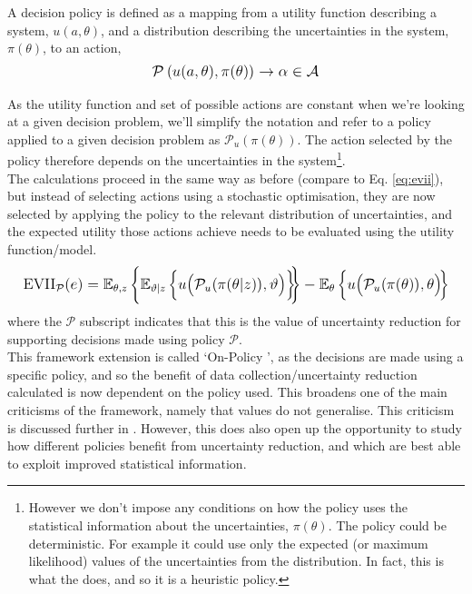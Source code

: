 A decision policy is defined as a mapping from a utility function describing a system, $u(a,\theta)$, and a distribution describing the uncertainties in the system, $\pi(\theta)$, to an action,
\begin{equation} \label{eq:policy-defn}
    \mathlarger{\mathcal{P} \left( u(a,\theta),\pi(\theta) \right) \rightarrow \alpha \in \mathcal{A}}
\end{equation}

As the utility function and set of possible actions are constant when we're looking at a given decision problem, we'll simplify the notation and refer to a policy applied to a given decision problem as $\mathcal{P}_u(\pi(\theta))$. The action selected by the policy therefore depends on the uncertainties in the system\footnote{However we don't impose any conditions on how the policy uses the statistical information about the uncertainties, $\pi(\theta)$. The policy could be deterministic. For example it could use only the expected (or maximum likelihood) values of the uncertainties from the distribution. In fact, this is what the  does, and so it is a heuristic policy.}.\\

The  calculations proceed in the same way as before (compare to Eq. \ref{eq:evii}), but instead of selecting actions using a stochastic optimisation, they are now selected by applying the policy to the relevant distribution of uncertainties, and the expected utility those actions achieve needs to be evaluated using the utility function/model.
\begin{equation} \label{eq:OP-voi}
    \mathlarger{
        \text{EVII}_{\mathcal{P}}(e) =
        \mathbb{E}_{\theta,z} \left\lbrace \mathbb{E}_{\vartheta|z} \left\lbrace u\!\left( \mathcal{P}_u\!\left(\pi (\theta|z)\right)\!,\vartheta \right) \right\rbrace\!\!\right\rbrace
        - \mathbb{E}_{\theta} \left\lbrace u\!\left(\mathcal{P}_u\!\left(\pi (\theta)\right)\!,\theta \right)\!\right\rbrace
    }
\end{equation}
where the $\mathcal{P}$ subscript indicates that this is the value of uncertainty reduction for supporting decisions made using policy $\mathcal{P}$.\\

This framework extension is called `On-Policy ', as the decisions are made using a specific policy, and so the benefit of data collection/uncertainty reduction calculated is now dependent on the policy used. This broadens one of the main criticisms of the  framework, namely that  values do not generalise. This criticism is discussed further in . However, this does also open up the opportunity to study how different policies benefit from uncertainty reduction, and which are best able to exploit improved statistical information.

